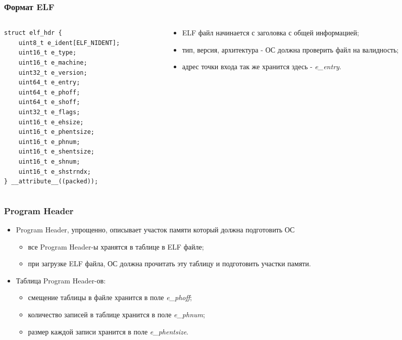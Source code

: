 \begin{frame}[fragile]
\frametitle{Формат ELF}
\begin{columns}
  \begin{column}{.36\linewidth}
    \begin{lstlisting}
struct elf_hdr {
    uint8_t e_ident[ELF_NIDENT];
    uint16_t e_type;
    uint16_t e_machine;
    uint32_t e_version;
    uint64_t e_entry;
    uint64_t e_phoff;
    uint64_t e_shoff;
    uint32_t e_flags;
    uint16_t e_ehsize;
    uint16_t e_phentsize;
    uint16_t e_phnum;
    uint16_t e_shentsize;
    uint16_t e_shnum;
    uint16_t e_shstrndx;
} __attribute__((packed));
    \end{lstlisting}
  \end{column}
  \begin{column}{.65\linewidth}
    \begin{itemize}
      \item ELF файл начинается с заголовка с общей информацией;
      \item тип, версия, архитектура - ОС должна проверить файл на валидность;
      \item адрес точки входа так же хранится здесь - \emph{e\_entry}.
    \end{itemize}
  \end{column}
\end{columns}
\end{frame}

\begin{frame}
\frametitle{Program Header}
\begin{itemize}
  \item Program Header, упрощенно, описывает участок памяти который должна
  подготовить ОС
  \begin{itemize}
    \item все Program Header-ы хранятся в таблице в ELF файле;
    \item при загрузке ELF файла, ОС должна прочитать эту таблицу и подготовить
    участки памяти.
  \end{itemize}
  \item Таблица Program Header-ов:
  \begin{itemize}
    \item смещение таблицы в файле хранится в поле \emph{e\_phoff};
    \item количество записей в таблице хранится в поле \emph{e\_phnum};
    \item размер каждой записи хранится в поле \emph{e\_phentsize}.
  \end{itemize}
\end{itemize}
\end{frame}

